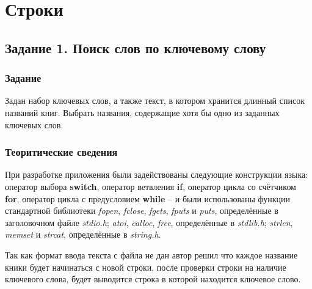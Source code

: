 \documentclass[12pt,a4paper]{report}
\begin{document}
%
\chapter{Строки}
\section{Задание 1. Поиск слов по ключевому слову}
\subsection{Задание}
\hspace{\parindent}
Задан набор ключевых слов, а также текст, в котором хранится длинный список названий
книг. Выбрать названия, содержащие хотя бы одно из заданных ключевых слов.
\subsection{Теоритические сведения}
\hspace{\parindent}
При разработке приложения были задействованы следующие конструкции языка: оператор выбора \textbf{switch}, оператор ветвления \textbf{if}, оператор цикла со счётчиком \textbf{for}, оператор цикла с предусловием \textbf{while} -- и были использованы функции стандартной библиотеки \textit{fopen}, \textit{fclose}, \textit{fgets}, \textit{fputs} и \textit{puts}, определённые в заголовочном файле \textit{stdio.h}; \textit{atoi}, \textit{calloc}, \textit{free}, определённые в \textit{stdlib.h}; \textit{strlen}, \textit{memset} и \textit{strcat}, определённые в \textit{string.h}.

\hspace{\parindent}
Так как формат ввода текста с файла не дан автор решил что каждое название кники будет начинаться с новой строки, после проверки строки на наличие ключевого слова, будет выводится строка в которой находится ключевое слово.
\end{document}
